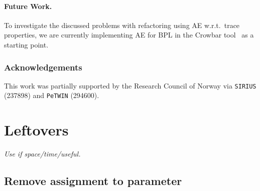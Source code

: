 \documentclass[runningheads]{llncs}
\begin{document}
\paragraph{Future Work.} 
To investigate the discussed problems with refactoring using AE w.r.t.\ trace properties, we are currently implementing AE for BPL in the Crowbar tool~\cite{crowbar} as a starting point.


\subsubsection*{Acknowledgements}
This work was partially supported by the Research Council of Norway via \texttt{SIRIUS} (237898) and \texttt{PeTWIN} (294600).
%

\section{Leftovers}
\textit{Use if space/time/useful.}
\subsection{Remove assignment to parameter}




\end{document}
